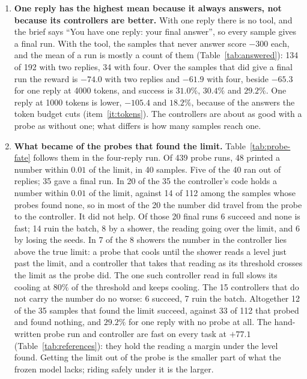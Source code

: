 \documentclass[11pt,a4paper]{article}
\begin{document}
\begin{enumerate}[leftmargin=1.5em]
  \item \textbf{One reply has the highest mean because it always answers,
  not because its controllers are better.} With one reply there is no tool,
  and the brief says ``You have one reply: your final answer'', so every
  sample gives a final run. With the tool, the samples that never answer
  score $-300$ each, and the mean of a run is mostly a count of them
  (Table~\ref{tab:answered}): 134 of 192 with two replies, 34 with four.
  Over the samples that did give a final run the reward is $-74.0$ with two
  replies and $-61.9$ with four, beside $-65.3$ for one reply at 4000
  tokens, and success is $31.0\%$, $30.4\%$ and $29.2\%$. One reply at 1000
  tokens is lower, $-105.4$ and $18.2\%$, because of the answers the token
  budget cuts (item~\ref{it:tokens}). The controllers are about as good
  with a probe as without one; what differs is how many samples reach one.

  \item \textbf{What became of the probes that found the limit.}
  \label{it:fate} Table~\ref{tab:probe-fate} follows them in the four-reply
  run. Of 439 probe runs, 48 printed a number within $0.01$ of the limit,
  in 40 samples. Five of the 40 ran out of replies; 35 gave a final run. In
  20 of the 35 the controller's code holds a number within $0.01$ of the
  limit, against 14 of 112 among the samples whose probes found none, so in
  most of the 20 the number did travel from the probe to the controller.
  It did not help. Of those 20 final runs 6 succeed and none is fast; 14
  ruin the batch, 8 by a shower, the reading going over the limit, and 6 by
  losing the seeds. In 7 of the 8 showers the number in the controller lies
  above the true limit: a probe that cools until the shower reads a level
  just past the limit, and a controller that takes that reading as its
  threshold crosses the limit as the probe did. The one such controller read
  in full slows its cooling at $80\%$ of the threshold and keeps cooling.
  The 15 controllers that do not carry the number do no worse: 6 succeed, 7
  ruin the batch. Altogether 12 of
  the 35 samples that found the limit succeed, against 33 of 112 that
  probed and found nothing, and $29.2\%$ for one reply with no probe at
  all. The hand-written probe run and controller are fast on every task at
  $+77.1$ (Table~\ref{tab:references}): they hold the reading a margin
  under the level found. Getting the limit out of the probe is the smaller
  part of what the frozen model lacks; riding safely under it is the
  larger.


\end{enumerate}
\end{document}
